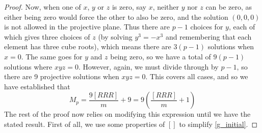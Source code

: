\begin{proof}
Now, when one of $x$, $y$ or $z$ is zero, say $x$, neither $y$ nor $z$ can be zero, as either being zero would force the other to also be zero, and the solution $(0,0,0)$ is not allowed in the projective plane. Thus there are $p-1$ choices for $y$, each of which gives three choices of $z$ (by solving $y^3 = -x^3$ and remembering that each element has three cube roots), which means there are $3(p-1)$ solutions when $x=0$. The same goes for $y$ and $z$ being zero, so we have a total of $9(p-1)$ solutions where $xyz=0$. However, again, we must divide through by $p-1$, so there are 9 projective solutions when $xyz=0$. This covers all cases, and so we have established that
\begin{equation}
M_p = \frac{9[RRR]}{m} + 9 = 9 \left(\frac{[RRR]}{m}+1\right) \label{g_initial}
\end{equation}
The rest of the proof now relies on modifying this expression until we have the stated result. First of all, we use some properties of $[]$ to simplify \eqref{g_initial}.


\end{proof}
